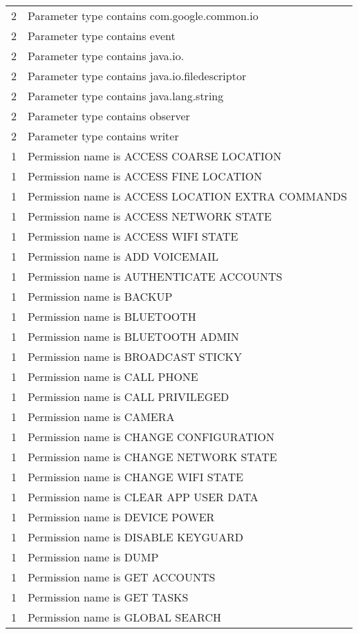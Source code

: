 \begin{center}
\begin{longtable}{l|l}
    2 & Parameter type contains com.google.common.io \\
    2 & Parameter type contains event \\
    2 & Parameter type contains java.io. \\
    2 & Parameter type contains java.io.filedescriptor \\
    2 & Parameter type contains java.lang.string \\
    2 & Parameter type contains observer \\
    2 & Parameter type contains writer \\
    1 & Permission name is ACCESS COARSE LOCATION \\
    1 & Permission name is ACCESS FINE LOCATION \\
    1 & Permission name is ACCESS LOCATION EXTRA COMMANDS \\
    1 & Permission name is ACCESS NETWORK STATE \\
    1 & Permission name is ACCESS WIFI STATE \\
    1 & Permission name is ADD VOICEMAIL \\
    1 & Permission name is AUTHENTICATE ACCOUNTS \\
    1 & Permission name is BACKUP \\
    1 & Permission name is BLUETOOTH \\
    1 & Permission name is BLUETOOTH ADMIN \\
    1 & Permission name is BROADCAST STICKY \\
    1 & Permission name is CALL PHONE \\
    1 & Permission name is CALL PRIVILEGED \\
    1 & Permission name is CAMERA \\
    1 & Permission name is CHANGE CONFIGURATION \\
    1 & Permission name is CHANGE NETWORK STATE \\
    1 & Permission name is CHANGE WIFI STATE \\
    1 & Permission name is CLEAR APP USER DATA \\
    1 & Permission name is DEVICE POWER \\
    1 & Permission name is DISABLE KEYGUARD \\
    1 & Permission name is DUMP \\
    1 & Permission name is GET ACCOUNTS \\
    1 & Permission name is GET TASKS \\
    1 & Permission name is GLOBAL SEARCH \\

\end{longtable}
\end{center}
